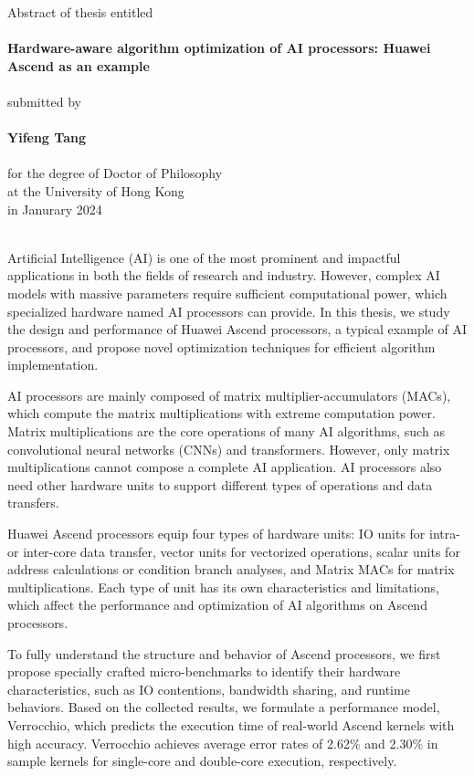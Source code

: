 \documentclass[12pt]{extbook}
\begin{document}
\centering
Abstract of thesis entitled\\
~\\
{\Large \bf 
    Hardware-aware algorithm optimization of AI processors: Huawei Ascend as an example
}\\
~\\
submitted by\\
~\\
{\Large \bf Yifeng Tang}\\
~\\
for the degree of Doctor of Philosophy\\
at the University of Hong Kong\\
in Janurary 2024\\
~\\
\justifying

Artificial Intelligence (AI) is one of the most prominent and impactful applications in both the fields of research and industry. However, complex AI models with massive parameters require sufficient computational power, which specialized hardware named AI processors can provide. In this thesis, we study the design and performance of Huawei Ascend processors, a typical example of AI processors, and propose novel optimization techniques for efficient algorithm implementation.

AI processors are mainly composed of matrix multiplier-accumulators (MACs), which compute the matrix multiplications with extreme computation power. Matrix multiplications are the core operations of many AI algorithms, such as convolutional neural networks (CNNs) and transformers. However, only matrix multiplications cannot compose a complete AI application. AI processors also need other hardware units to support different types of operations and data transfers.

Huawei Ascend processors equip four types of hardware units: IO units for intra- or inter-core data transfer, vector units for vectorized operations, scalar units for address calculations or condition branch analyses, and Matrix MACs for matrix multiplications. Each type of unit has its own characteristics and limitations, which affect the performance and optimization of AI algorithms on Ascend processors.

To fully understand the structure and behavior of Ascend processors, we first propose specially crafted micro-benchmarks to identify their hardware characteristics, such as IO contentions, bandwidth sharing, and runtime behaviors. Based on the collected results, we formulate a performance model, Verrocchio, which predicts the execution time of real-world Ascend kernels with high accuracy. Verrocchio achieves average error rates of 2.62$\%$ and 2.30$\%$ in sample kernels for single-core and double-core execution, respectively.
\end{document}
